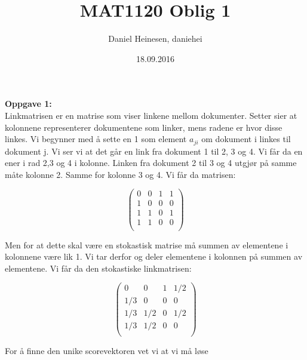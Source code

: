 \documentclass[a4paper,norsk,11pt,twoside]{article}
\date{18.09.2016}
\title{MAT1120 Oblig 1}
\author{Daniel Heinesen, daniehei}
\begin{document}
\maketitle
\newpage

\textbf{Oppgave 1:}\\

Linkmatrisen er en matrise som viser linkene mellom dokumenter. Setter sier at kolonnene representerer dokumentene som linker, mens radene er hvor disse linkes. Vi begynner med å sette en 1 som element $a_{ji}$ om dokument i linkes til dokument j. Vi ser vi at det går en link fra dokument 1 til 2, 3 og 4. Vi får da en ener i rad 2,3 og 4 i kolonne. Linken fra dokument 2 til 3 og 4 utgjør på samme måte kolonne 2. Samme for kolonne 3 og 4. Vi får da matrisen:

$$
\begin{pmatrix}
0 & 0 & 1 & 1\\
1 & 0 & 0 & 0\\
1 & 1 & 0 & 1\\
1 & 1 & 0 & 0\\
\end{pmatrix}
$$

Men for at dette skal være en stokastisk matrise må summen av elementene i kolonnene være lik 1. Vi tar derfor og deler elementene i kolonnen på summen av elementene. Vi får da den stokastiske linkmatrisen:


$$
\begin{pmatrix}
0 & 0 & 1 & 1/2\\
1/3 & 0 & 0 & 0\\
1/3 & 1/2 & 0 & 1/2\\
1/3 & 1/2 & 0 & 0\\
\end{pmatrix}
$$

For å finne den unike scorevektoren vet vi at vi må løse
\end{document}
